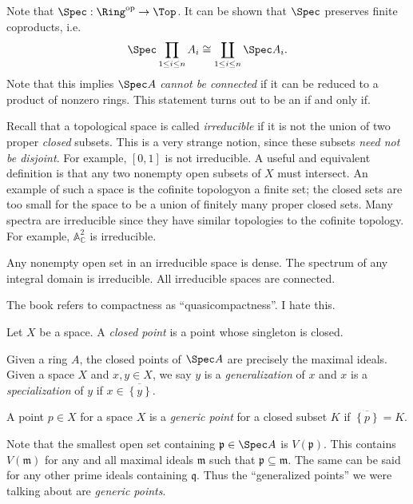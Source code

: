 Note that $\Spec : \Ring ^{\mathrm{op}}  \to \Top $. It can be shown that $\Spec$ preserves finite coproducts, i.e.
\[
	\Spec \prod_{1\leq i\leq n} A_i \cong \coprod_{1\leq i\leq n} \Spec A_i
.\]
Note that this implies $\Spec A$ \emph{cannot be connected} if it can be reduced to a product of nonzero rings. This statement turns out to be an if and only if.


Recall that a topological space is called \emph{irreducible} if it is not the union of two proper \emph{closed} subsets. This is a very strange notion, since these subsets \emph{need not be disjoint}. For example, $[0,1]$ is not irreducible. A useful and equivalent definition is  that any two nonempty open subsets of $X$ must intersect. An example of such a space is the cofinite topologyon a finite set; the closed sets are too small for the space to be a union of finitely many proper closed sets. Many spectra are irreducible since they have similar topologies to the cofinite topology. For example, $\mathbb{A} _{\mathbb{C} } ^2$ is irreducible.

Any nonempty open set in an irreducible space is dense. The spectrum of any integral domain is irreducible. All irreducible spaces are connected.

The book refers to compactness as ``quasicompactness''. I hate this.

\begin{definition}\label{dfn:3-6-1}
	Let $X$ be a space. A \emph{closed point} is a point whose singleton is closed.
\end{definition}

Given a ring $A$, the closed points of $\Spec A$ are precisely the maximal ideals. Given a space $X$ and $x,y\in X$, we say $y$ is a \emph{generalization} of $x$ and $x$ is a \emph{specialization} of $y$ if $x\in \overline{\left\{ y \right\} } $.

\begin{definition}\label{dfn:3-6-2}
	A point $p\in X$ for a space $X$ is a \emph{generic point} for a closed subset $K$ if $\overline{\left\{ p \right\} } =K$.
\end{definition}

Note that the smallest open set containing $\mathfrak{p} \in\Spec A$ is $V(\mathfrak{p} )$. This contains $V(\mathfrak{m} )$ for any and all maximal ideals $\mathfrak{m} $ such that $\mathfrak{p} \subseteq \mathfrak{m} $. The same can be said for any other prime ideals containing $\mathfrak{q} $. Thus the ``generalized points'' we were talking about are \emph{generic points}.

